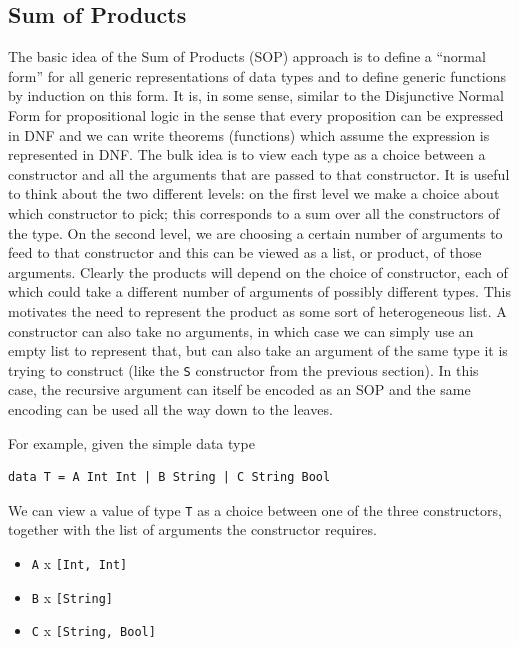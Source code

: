 \documentclass[11pt, titlepage]{article}
\newcommand{\toHaskell}[1]{\texttt{#1}\xspace}
\begin{document}
\subsection{Sum of Products}\label{SOP}

The basic idea of the Sum of Products (SOP) approach is to define a ``normal form'' for all generic representations of data types and 
to define generic functions by induction on this form. It is, in some sense, similar to the Disjunctive Normal Form for propositional logic in the sense that every proposition can be expressed in DNF and we can write theorems (functions) which assume the expression is represented in DNF.
The bulk idea is to view each type as a choice between a constructor and all the arguments that are passed to that constructor. It is useful to think about the two different levels: on the first level we make a choice about which constructor to pick; this corresponds to a sum over all the constructors of the type. On the second level, we are choosing a certain number of arguments to feed to that constructor and this can be viewed as a list, or product, of those arguments. 
Clearly the products will depend on the choice of constructor, each of which could take a different number of arguments of possibly 
different types. This motivates the need to represent the product as some sort of heterogeneous list. 
A constructor can also take no arguments, in which case we can simply use an empty list to represent that, but can also take an argument of the same type it is trying to construct (like the \texttt{S} constructor from the previous section). 
In this case, the recursive argument can itself be encoded as an SOP and the same encoding can be used all the way down to the leaves. 

For example, given the simple data type

\begin{verbatim}
data T = A Int Int | B String | C String Bool
\end{verbatim}

We can view a value of type \toHaskell{T} as a choice between one of the three constructors, together with the list of arguments the constructor requires.

\begin{itemize}
\item \toHaskell{A} x \toHaskell{[Int, Int]}
\item \toHaskell{B} x \toHaskell{[String]}
\item \toHaskell{C} x \toHaskell{[String, Bool]}
\end{itemize}
\end{document}
